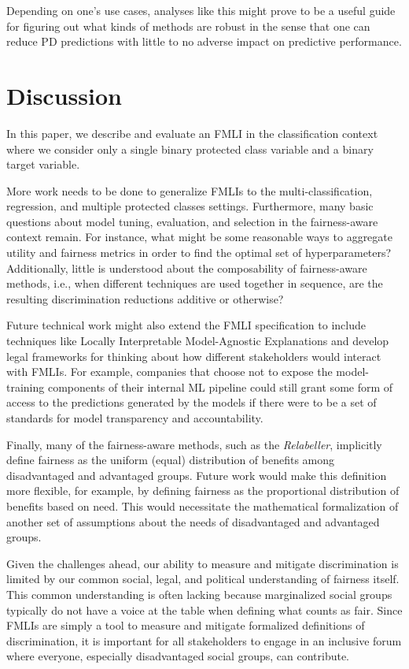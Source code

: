 \documentclass{acm_proc_article-sp}
\begin{document}
Depending on one's use cases, analyses like this might prove to be a useful
guide for figuring out what kinds of methods are robust in the sense that one
can reduce PD predictions with little to no adverse
impact on predictive performance.

\section{Discussion}

In this paper, we describe and evaluate an FMLI in the classification context
where we consider only a single binary protected class variable and a binary
target variable.

More work needs to be done to generalize FMLIs to the multi-classification,
regression, and multiple protected classes settings. Furthermore, many basic
questions about model tuning, evaluation, and selection in the fairness-aware
context remain. For instance, what might be some reasonable ways to aggregate
utility and fairness metrics in order to find the optimal set of
hyperparameters? Additionally, little is understood about the composability of
fairness-aware methods, i.e., when different techniques are used together in
sequence, are the resulting discrimination reductions additive or otherwise?

Future technical work might also extend the FMLI specification to include
techniques like Locally Interpretable Model-Agnostic Explanations
\cite{ribeiro2016should} and develop legal frameworks for thinking about how
different stakeholders would interact with FMLIs. For example, companies that
choose not to expose the model-training components of their internal ML
pipeline could still grant some form of access to the predictions generated by
the models if there were to be a set of standards for model transparency and
accountability.

Finally, many of the fairness-aware methods, such as the \emph{Relabeller},
implicitly define fairness as the uniform (equal) distribution of benefits among
disadvantaged and advantaged groups. Future work would make this definition more
flexible, for example, by defining fairness as the proportional distribution of
benefits based on need. This would necessitate the mathematical formalization of
another set of assumptions about the needs of disadvantaged and advantaged
groups.

Given the challenges ahead, our ability to measure and mitigate discrimination
is limited by our common social, legal, and political understanding of fairness
itself. This common understanding is often lacking because marginalized social
groups typically do not have a voice at the table when defining what counts as
fair. Since FMLIs are simply a tool to measure and mitigate formalized
definitions of discrimination, it is important for all stakeholders to engage in
an inclusive forum where everyone, especially disadvantaged social groups, can
contribute.

\nocite{*}


\end{document}
